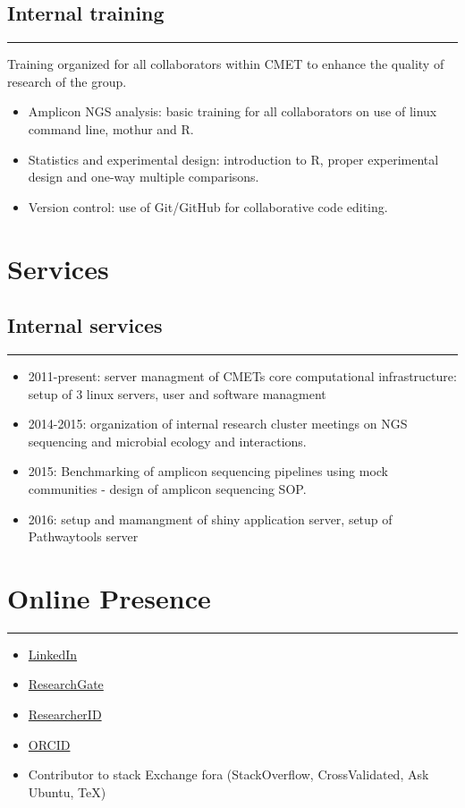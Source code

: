 \documentclass[a4paper,11pt,oneside]{article}
\begin{document}
\subsection*{Internal training}
\rule{\textwidth}{1pt}
Training organized for all collaborators within CMET to enhance the quality of research of the group.
\begin{itemize}
  \item Amplicon NGS analysis: basic training for all collaborators on use of linux command line, mothur and R.
  \item Statistics and experimental design: introduction to R, proper experimental design and one-way multiple comparisons.
  \item Version control: use of Git/GitHub for collaborative code editing.
\end{itemize}

\section*{Services}

\subsection*{Internal services}
\rule{\textwidth}{1pt}
\begin{itemize}
	\item 2011-present: server managment of CMETs core computational infrastructure: setup of 3 linux servers, user and software managment
	\item 2014-2015: organization of internal research cluster meetings on NGS sequencing and microbial ecology and interactions.
	\item 2015: Benchmarking of amplicon sequencing pipelines using mock communities - design of amplicon sequencing SOP.
	\item 2016: setup and mamangment of shiny application server, setup of Pathwaytools server
\end{itemize}
\section*{Online Presence}
\rule{\textwidth}{1pt}
\begin{itemize}
  \item \href{https://www.linkedin.com/pub/frederiek-maarten-kerckhof/26/b47/668}{LinkedIn}
  \item \href{https://www.researchgate.net/profile/Frederiek-Maarten_Kerckhof}{ResearchGate}
  \item \href{http://www.researcherid.com/ProfileView.action?SID=V2bGbhtEe1TlsfIEXBz&returnCode=ROUTER.Success&queryString=KG0UuZjN5WlUD2sX8KoC12Tw17vPT2A6ocQ5tgzRDDI\%253D\&SrcApp=CR\&Init=Yes}{ResearcherID}
  \item \href{http://orcid.org/0000-0002-4472-6810}{ORCID}
  \item Contributor to stack Exchange fora (StackOverflow, CrossValidated, Ask Ubuntu, TeX)
\end{itemize}

\newpage
\renewcommand{\refname}{Academic publications and conference proceedings} %
\renewcommand{\bibname}{Academic publications and conference proceedings} %
\nocite{*}


%
\end{document}
